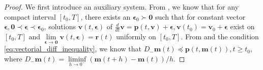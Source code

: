 \documentclass[letterpaper, 10 pt, journal, twoside]{IEEEtran}
\theoremstyle{plain}
\newcommand{\myvar}[1]{\bm{#1}}
\begin{document}
 \begin{proof}
 	We first introduce an auxiliary system. From \cite[ Theorem~1.5.1]{lakshmikantham1989stability}, we know that for any compact interval $ [t_0,T] $, there exists an $ \myvar{\epsilon}_0 \succ \myvar{0} $ such that for constant vector $ \myvar{\epsilon}, \myvar{0} \prec \myvar{\epsilon}\prec \myvar{\epsilon}_0 $, solutions $ \myvar{v}(t,\myvar{\epsilon}) $ of $ 	\tfrac{d}{dt}\myvar{v} = \myvar{p}(t,\myvar{v}) + \myvar{\epsilon}, \myvar{v}(t_0) = \myvar{v}_0 + \myvar{\epsilon}$
 	exist on $ [t_0, T] $ and $ \underset{\myvar{\epsilon}\to \myvar{0}}{\lim}   \myvar{v}(t,\myvar{\epsilon}) = \myvar{r}(t) $ uniformly on $ [t_0, T] $. From \cite[ Lemma~1.5.1]{lakshmikantham1989stability} and the condition \eqref{eq:vectorial_diff_inequality}, we know that $ D_{-}\myvar{m}(t) \preceq \myvar{p}(t,\myvar{m}(t)), t \geq t_0 $, where $ D_{-}\myvar{m}(t) = \underset{h\to 0^{-}}{\liminf} (\myvar{m}(t+h) - \myvar{m}(t))/h $.
 	

\end{proof}
\end{document}
